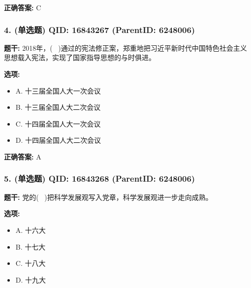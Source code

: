 \documentclass[12pt,UTF8]{ctexart}
\begin{document}
\textbf{正确答案:}
C

\vspace{0.3em}\hrulefill\vspace{0.7em}

\subsubsection*{4. (单选题) \small QID: 16843267 (ParentID: 6248006)}

\textbf{题干:}
2018年，(  )通过的宪法修正案，郑重地把习近平新时代中国特色社会主义思想载入宪法，实现了国家指导思想的与时俱进。



\textbf{选项:}
\begin{itemize}[leftmargin=*]

  \item A. 十三届全国人大一次会议

  \item B. 十三届全国人大二次会议

  \item C. 十四届全国人大一次会议

  \item D. 十四届全国人大二次会议

\end{itemize}

\textbf{正确答案:}
A

\vspace{0.3em}\hrulefill\vspace{0.7em}

\subsubsection*{5. (单选题) \small QID: 16843268 (ParentID: 6248006)}

\textbf{题干:}
党的(  )把科学发展观写入党章，科学发展观进一步走向成熟。



\textbf{选项:}
\begin{itemize}[leftmargin=*]

  \item A. 十六大

  \item B. 十七大

  \item C. 十八大

  \item D. 十九大

\end{itemize}
\end{document}
